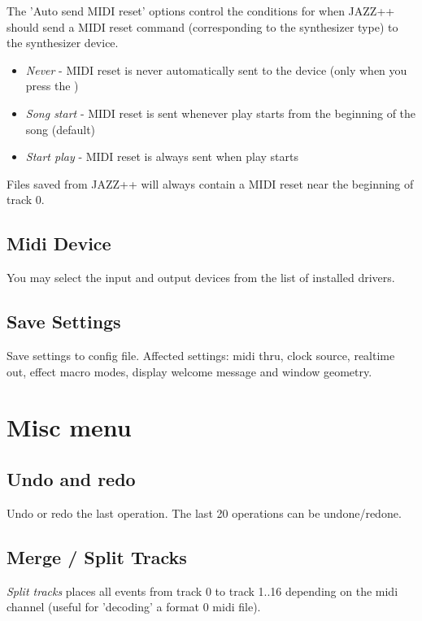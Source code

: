 \documentclass[letterpaper]{report}
\begin{document}
The 'Auto send MIDI reset' options control the conditions for when JAZZ++
should send a MIDI reset command (corresponding to the synthesizer type) to the
synthesizer device.

\begin{itemize}
\item {\em Never} - MIDI reset is never automatically sent to the device
(only when you press the )
\item {\em Song start} - MIDI reset is sent whenever play starts from the
beginning of the song (default)
\item {\em Start play} - MIDI reset is always sent when play starts
\end{itemize}

Files saved from JAZZ++ will always contain a MIDI reset near the beginning
of track 0.

\subsection{Midi Device}

You may select the input and output devices from the list of installed
drivers.

\subsection{Save Settings}
Save settings to config file.
Affected settings: midi thru, clock source, realtime out, effect macro modes,
display welcome message and window geometry.


\section{Misc menu}

\subsection{Undo and redo}\label{undo}

Undo or redo the last operation. The last 20 operations can be undone/redone.


\subsection{Merge / Split Tracks}

{\em Split tracks} places all events from track 0 to track 1..16 depending on
the midi channel (useful for 'decoding' a format 0 midi file).
\end{document}
